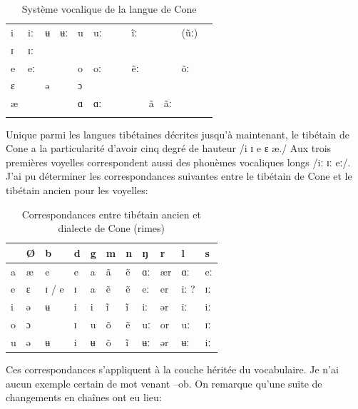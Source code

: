 \documentclass[oldfontcommands,oneside,a4paper,11pt]{memoir}
\newcommand{\ipa}[1]{{\phon #1}} %
\begin{document}
\begin{table}[H]
\caption{Système vocalique de la langue de Cone}\label{tab:cone1}
\begin{tabular}{lllllllllllll} 
\toprule
i  &  	iː  &  	ʉ  &  	ʉː  &  	u  &  	uː  &  	   &  	   &  	ĩː  &  	   &  	   &  	(ũː)  &  \\
ɪ  &  	ɪː  &  	   &  	   &  	   &  	   &  	   &  	   &  	   &  	   &  	   &  	   &  \\
e  &  	eː  &  	   &  	   &  	o  &  	oː  &  	   &  	   &  	ẽː  &  	   &  	   &  	õː  &  \\
ɛ  &  	   &  	ə  &  	   &  	ɔ  &  	   &  	   &  	   &  	   &  	   &  	   &  	   &  \\
æ  &  	   &  	   &  	   &  	ɑ  &  	ɑː  &  	   &  	   &  	   &  	ã  &  	ãː  &  	   &  \\
  &  	  &  	  &  	  &  	  &  	  &  	  &  	  &  	  &  	  &  	  &  	  &  \\
\bottomrule
\end{tabular}
\end{table}
Unique parmi les langues tibétaines décrites jusqu'à maintenant, le tibétain de Cone a la particularité d'avoir cinq degré de hauteur /i ɪ e ɛ æ./ Aux trois premières voyelles correspondent aussi des  phonèmes vocaliques longs /iː ɪː eː/. J'ai pu déterminer les correspondances suivantes entre le tibétain de Cone et le tibétain ancien pour les voyelles:
\begin{table}[H]
\caption{Correspondances entre tibétain ancien et dialecte de Cone (rimes)}\label{tab:cone}
\begin{tabular}{l|llllllllll} 
\toprule
   &  	Ø  &  	b  &  	d  &  	g  &  	m  &  	n  &  	ŋ  &  	r  &  	l  &  	s  \\
\midrule
a  &  	æ  &  	e  &  	e  &  	a  &  	ã  &  	ẽ  &  	ɑː  &  	ær  &  	ɑː  &  	eː   \\
e  &  	ɛ  &  	ɪ / e  &  	ɪ  &  	a  &  	ẽ  &  	ẽ  &  	eː  &  	er  &  	iː ?  &  	ɪː   \\
i  &  	ə  &  	ʉ  &  	i  &  	i  &  	ĩ  &  	ĩ  &  	iː  &  	ər  &  	iː  &  	iː   \\
o  &  	ɔ  &  	   &  	ɪ  &  	u  &  	õ  &  	ẽ  &  	uː  &  	or  &  	uː  &  	ɪː   \\
u  &  	ə  &  	ʉ  &  	i  &  	ʉ  &  	õ  &  	ĩ  &  	ʉː  &  	ər  &  	ʉː  &  	iː   \\ 
\bottomrule
\end{tabular}
\end{table}
Ces correspondances s'appliquent à la couche héritée du vocabulaire. Je n'ai aucun exemple certain de mot venant --\ipa{ob}. On remarque qu'une suite de changements en chaînes ont eu lieu: 
\end{document}
